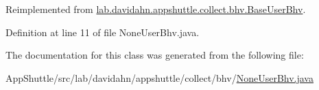 \-Reimplemented from \hyperlink{classlab_1_1davidahn_1_1appshuttle_1_1collect_1_1bhv_1_1_base_user_bhv_ab6813ac64ce1f0d009c892b5cac261d6}{lab.\-davidahn.\-appshuttle.\-collect.\-bhv.\-Base\-User\-Bhv}.



\-Definition at line 11 of file \-None\-User\-Bhv.\-java.



\-The documentation for this class was generated from the following file\-:\begin{DoxyCompactItemize}
\item 
\-App\-Shuttle/src/lab/davidahn/appshuttle/collect/bhv/\hyperlink{_none_user_bhv_8java}{\-None\-User\-Bhv.\-java}\end{DoxyCompactItemize}
